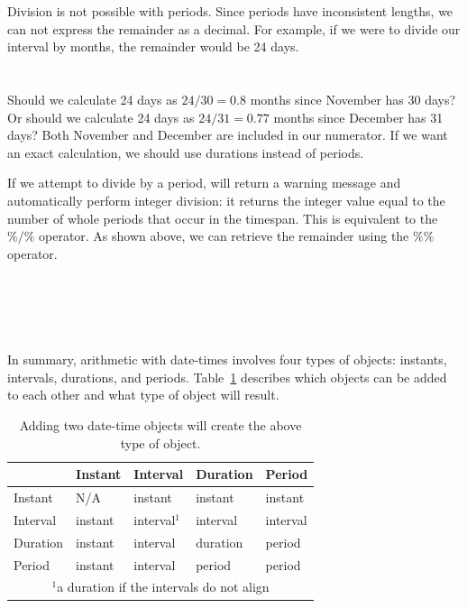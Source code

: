 \documentclass[article]{jss}
\begin{document}
Division is not possible with periods. Since periods have inconsistent lengths, we can not express the remainder as a decimal. For example, if we were to divide our interval by months, the remainder would be 24 days.\\

\\
\\

Should we calculate 24 days as $24 / 30 = 0.8$ months since November has 30 days? Or should we calculate 24 days as $24 / 31 = 0.77$ months since December has 31 days? Both November and December are included in our numerator. If we want an exact calculation, we should use durations instead of periods. 

If we attempt to divide by a period,  will return a warning message and automatically perform integer division: it returns the integer value equal to the number of whole periods that occur in the timespan. This is equivalent to the $\%/\%$ operator. As shown above, we can retrieve the remainder using the $\%\%$ operator.\\

\\
\\
\\
\\
\\

In summary, arithmetic with date-times involves four types of objects: instants, intervals, durations, and periods. Table~\ref{tbl:date-math} describes which objects can be added to each other and what type of object will result.

\begin{table}
  \begin{center}
  \begin{tabular}{lllll}
  \toprule
  & Instant & Interval & Duration & Period\\
  \midrule
  Instant & N/A & instant & instant & instant\\
  Interval & instant & interval$^{1}$ & interval & interval\\
  Duration & instant & interval & duration & period\\
  Period & instant & interval & period & period\\
  \bottomrule
  \multicolumn{5}{c}{\footnotesize{$^{1}$a duration if the intervals do not align}}\\
    
  \end{tabular}
  \end{center}
  \caption{Adding two date-time objects will create the above type of object.}
  \label{tbl:date-math}
\end{table}
\end{document}
